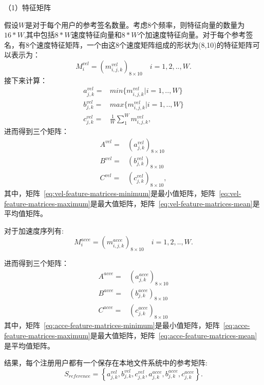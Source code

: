 （1）特征矩阵

假设$W$是对于每个用户的参考签名数量。考虑8个频率，则特征向量的数量为$16*W$,其中包括$8*W$速度特征向量和$8*W$个加速度特征向量。对于每个参考签名，有8个速度特征矩阵，一个由这8个速度矩阵组成的形状为(8,10)的特征矩阵可以表示为：
\begin{equation}
  M_{i}^{vel}=\left( m^{vel}_{i,j,k}\right)_{8\times10} \quad i=1,2,..,W.
\end{equation}
接下来计算：
\begin{align} 
   a_{j,k}^{vel} =& min\{m^{vel}_{i,j,k}|i=1,..,W\} \\
   b_{j,k}^{vel} =& max\{m^{vel}_{i,j,k}|i=1,..,W\} \\
   c_{j,k}^{vel} =& \frac{1}{W}\sum_{1}^{W}m^{vel}_{i,j,k},
\end{align}
进而得到三个矩阵：
\begin{align}
A^{vel} =& \left(a_{j,k}^{vel}  \right)_{8\times10} \label{eq:vel-feature-matrices-minimum}\\  
B^{vel} =& \left( b_{j,k}^{vel} \right)_{8\times 10} \label{eq:vel-feature-matrices-maximum}\\ 
C^{vel} =& \left( c_{j,k}^{vel} \right)_{8\times 10} ,  \label{eq:vel-feature-matrices-mean}
\end{align}
其中，矩阵~\ref{eq:vel-feature-matrices-minimum}是最小值矩阵，矩阵~\ref{eq:vel-feature-matrices-maximum}是最大值矩阵，矩阵~\ref{eq:vel-feature-matrices-mean}是平均值矩阵。

对于加速度序列有:
\begin{equation}
  M_{i}^{acce}=\left( m^{acce}_{i,j,k}\right)_{8\times10} \quad i=1,2,..,W.
\end{equation}

进而得到三个矩阵：
\begin{align}
A^{acce} =& \left(a_{j,k}^{acce}  \right)_{8\times10}  \label{eq:acce-feature-matrices-minimum} \\
B^{acce} =& \left( b_{j,k}^{acce} \right)_{8\times10}  \label{eq:acce-feature-matrices-maximum} \\
C^{acce} =& \left( c_{j,k}^{acce} \right)_{8\times 10} \label{eq:acce-feature-matrices-mean}
\end{align}
其中，矩阵~\ref{eq:acce-feature-matrices-minimum}是最小值矩阵，矩阵~\ref{eq:acce-feature-matrices-maximum}是最大值矩阵，矩阵~\ref{eq:acce-feature-matrices-mean}是平均值矩阵。

结果，每个注册用户都有一个保存在本地文件系统中的参考矩阵:
\begin{equation}
 S_{reference}=\left\{ a_{j,k}^{vel},b_{j,k}^{vel},c_{j,k}^{vel},a_{j,k}^{acce},b_{j,k}^{acce},c_{j,k}^{acce} \right\}.
\end{equation}

